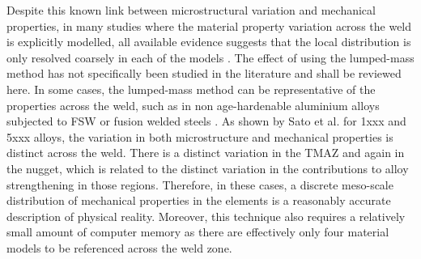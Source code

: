 Despite this known link between microstructural variation and mechanical properties, in many studies where the material property variation across the weld is explicitly modelled, all available evidence suggests that the local distribution is only resolved coarsely in each of the models \cite{McWilliams2013,Grujicic2011,Zhao2001,Zadpoor2009,Reis2004,Kim2010,Kim2010a}. 
The effect of using the lumped-mass method has not specifically been studied in the literature and shall be reviewed here.
%
%
In some cases, the lumped-mass method can be representative of the properties across the weld, such as in non age-hardenable aluminium alloys subjected to FSW or fusion welded steels \cite{Sato2001b,Reis2004}. As shown by Sato et al. for 1xxx and 5xxx alloys, the variation in both microstructure and mechanical properties is distinct across the weld. There is a distinct variation in the TMAZ and again in the nugget, which is related to the distinct variation in the contributions to alloy strengthening in those regions. Therefore, in these cases, a discrete meso-scale distribution of mechanical properties in the elements
is a reasonably accurate description of physical reality. Moreover, this technique also requires a relatively small amount of computer memory as there are effectively only four material models to be referenced across the weld zone. 

